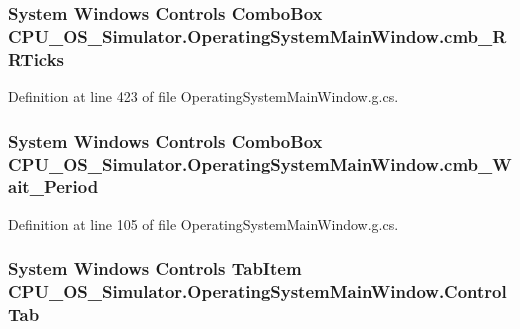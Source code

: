 \subsubsection[{cmb\+\_\+\+R\+R\+Ticks}]{\setlength{\rightskip}{0pt plus 5cm}System Windows Controls Combo\+Box C\+P\+U\+\_\+\+O\+S\+\_\+\+Simulator.\+Operating\+System\+Main\+Window.\+cmb\+\_\+\+R\+R\+Ticks\hspace{0.3cm}{\ttfamily [package]}}\label{class_c_p_u___o_s___simulator_1_1_operating_system_main_window_a599d396665359bf3ff8c1a9a9e220229}


Definition at line 423 of file Operating\+System\+Main\+Window.\+g.\+cs.

\hypertarget{class_c_p_u___o_s___simulator_1_1_operating_system_main_window_a4da0c086d71c3b794c9cd816aafeac88}{}
\subsubsection[{cmb\+\_\+\+Wait\+\_\+\+Period}]{\setlength{\rightskip}{0pt plus 5cm}System Windows Controls Combo\+Box C\+P\+U\+\_\+\+O\+S\+\_\+\+Simulator.\+Operating\+System\+Main\+Window.\+cmb\+\_\+\+Wait\+\_\+\+Period\hspace{0.3cm}{\ttfamily [package]}}\label{class_c_p_u___o_s___simulator_1_1_operating_system_main_window_a4da0c086d71c3b794c9cd816aafeac88}


Definition at line 105 of file Operating\+System\+Main\+Window.\+g.\+cs.

\hypertarget{class_c_p_u___o_s___simulator_1_1_operating_system_main_window_a06541ab6c749adc4696fe5ec1f174fcf}{}
\subsubsection[{Control\+Tab}]{\setlength{\rightskip}{0pt plus 5cm}System Windows Controls Tab\+Item C\+P\+U\+\_\+\+O\+S\+\_\+\+Simulator.\+Operating\+System\+Main\+Window.\+Control\+Tab\hspace{0.3cm}{\ttfamily [package]}}\label{class_c_p_u___o_s___simulator_1_1_operating_system_main_window_a06541ab6c749adc4696fe5ec1f174fcf}


